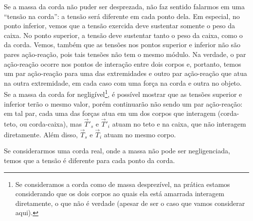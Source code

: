 Se a massa da corda não puder ser desprezada, não faz sentido falarmos em uma ``tensão na corda'': a tensão será diferente em cada ponto dela. Em especial, no ponto inferior, vemos que a tensão exercida deve sustentar somente o peso da caixa. No ponto superior, a tensão deve sustentar tanto o peso da caixa, como o da corda. Vemos, também que as tensões nos pontos superior e inferior não são pares ação-reação, pois tais tensões não tem o mesmo módulo. Na verdade, o par ação-reação ocorre nos pontos de interação entre dois corpos e, portanto, temos um par ação-reação para uma das extremidades e outro par ação-reação que atua na outra extremidade, em cada caso com uma força na corda e outra no objeto. Se a massa da corda for negligível\footnote{Se consideramos a corda como de massa desprezível, na prática estamos considerando que os dois corpos ao quais ela está amarrada interagem diretamente, o que não é verdade (apesar de ser o caso que vamos considerar aqui).}, é possível mostrar que as tensões superior e inferior terão o mesmo valor, porém continuarão não sendo um par ação-reação: em tal par, cada uma das forças atua em um dos corpos que interagem (corda-teto, ou corda-caixa), mas $\vec{T}'_s$ e $\vec{T}'_i$ atuam no teto e na caixa, que não interagem diretamente. Além disso, $\vec{T}_s$ e $\vec{T}_i$ atuam no mesmo corpo.

\begin{marginfigure}
\centering
{}
\caption{Se considerarmos uma corda real, onde a massa não pode ser negligenciada, temos que a tensão é diferente para cada ponto da corda.}
\end{marginfigure}

